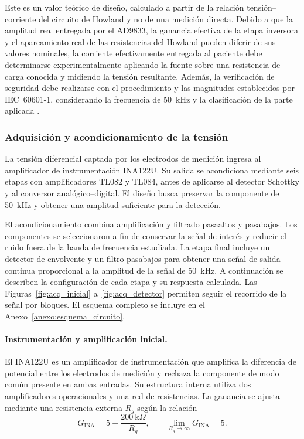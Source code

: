 \documentclass[12pt,a4paper]{article}
\begin{document}
Este es un valor teórico de diseño, calculado a partir de la relación tensión--corriente del circuito de
Howland y no de una medición directa. Debido a que la amplitud real entregada por el AD9833, la ganancia
efectiva de la etapa inversora y el apareamiento real de las resistencias del Howland pueden diferir de
sus valores nominales, la corriente efectivamente entregada al paciente debe determinarse
experimentalmente aplicando la fuente sobre una resistencia de carga conocida y midiendo la tensión
resultante. Además, la verificación de seguridad debe realizarse con el procedimiento y las magnitudes
establecidos por IEC~60601-1, considerando la frecuencia de 50~kHz y la clasificación de la parte
aplicada \cite{iec60601}.

\subsubsection{Adquisición y acondicionamiento de la tensión}

La tensión diferencial captada por los electrodos de medición ingresa al amplificador de
instrumentación INA122U. Su salida se acondiciona mediante seis etapas con amplificadores TL082 y
TL084, antes de aplicarse al detector Schottky y al conversor analógico--digital. El diseño busca
preservar la componente de 50~kHz y obtener una amplitud suficiente para la detección.

El acondicionamiento combina amplificación y filtrado pasaaltos y pasabajos. Los componentes se seleccionaron a fin 
de conservar la señal de interés y reducir el ruido fuera de la banda de frecuencia estudiada. La etapa final 
incluye un detector de envolvente y un filtro pasabajos para obtener una señal de salida continua proporcional a 
la amplitud de la señal de 50~kHz. A continuación se describen la configuración
de cada etapa y su respuesta calculada. Las Figuras~\ref{fig:acq_inicial} a~\ref{fig:acq_detector}
permiten seguir el recorrido de la señal por bloques. El esquema completo se incluye en el
Anexo~\ref{anexo:esquema_circuito}.

\paragraph{Instrumentación y amplificación inicial.}
El INA122U es un amplificador de instrumentación que amplifica la diferencia de potencial entre los
electrodos de medición y rechaza la componente de modo común presente en ambas entradas. Su estructura
interna utiliza dos amplificadores operacionales y una red de resistencias. La ganancia se ajusta
mediante una resistencia externa $R_g$ según
la relación \cite{ti_ina122}
\begin{equation}
    G_{\mathrm{INA}}=5+\frac{200~\mathrm{k}\Omega}{R_g},\qquad
    \lim_{R_g\to\infty}G_{\mathrm{INA}}=5.
\end{equation}
\end{document}
